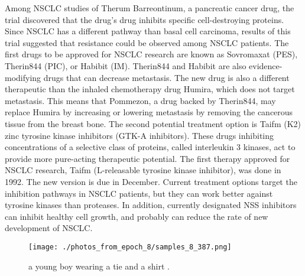 \documentclass{article}%
\begin{document}
Among NSCLC studies of Therum Barreontinum, a pancreatic cancer drug, the trial discovered that the drug's drug inhibits specific cell{-}destroying proteins. Since NSCLC has a different pathway than basal cell carcinoma, results of this trial suggested that resistance could be observed among NSCLC patients.\newline%
The first drugs to be approved for NSCLC research are known as Sovromaxat (PES), Therin844 (PIC), or Habibit (IM). Therin844 and Habibit are also evidence{-}modifying drugs that can decrease metastasis.\newline%
The new drug is also a different therapeutic than the inhaled chemotherapy drug Humira, which does not target metastasis. This means that Pommezon, a drug backed by Therin844, may replace Humira by increasing or lowering metastasis by removing the cancerous tissue from the breast bone.\newline%
The second potential treatment option is Taifm (K2) zinc tyrosine kinase inhibitors (GTK{-}A inhibitors). These drugs inhibiting concentrations of a selective class of proteins, called interleukin 3 kinases, act to provide more pure{-}acting therapeutic potential.\newline%
The first therapy approved for NSCLC research, Taifm (L{-}releasable tyrosine kinase inhibitor), was done in 1992. The new version is due in December. Current treatment options target the inhibition pathways in NSCLC patients, but they can work better against tyrosine kinases than proteases. In addition, currently designated NSS inhibitors can inhibit healthy cell growth, and probably can reduce the rate of new development of NSCLC.\newline%

%


\begin{figure}[h!]%
\centering%
\texttt{[image: ./photos\_from\_epoch\_8/samples\_8\_387.png]}%
\caption{a young boy wearing a tie and a shirt .}%
\end{figure}

%
\end{document}
